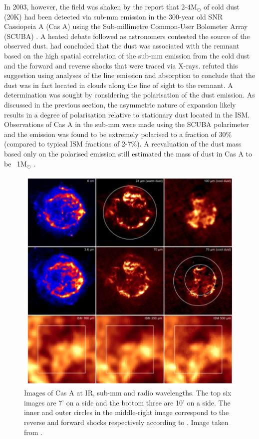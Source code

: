 In 2003, however, the field was shaken by the report that 2-4M$_{\odot}$ of cold dust (20K) had been detected via sub-mm emission in the 300-year old SNR Cassiopeia A (Cas A) using the Sub-millimetre Common-User Bolometer Array (SCUBA) \citep{Dunne2003}.   A heated debate followed as astronomers contested the source of the observed dust.  \citet{Dunne2003} had concluded that the dust was associated with the remnant based on the high spatial correlation of the sub-mm emission from the cold dust and the forward and reverse shocks that were traced via X-rays. \citet{Krause2004} refuted this suggestion using analyses of the line emission and absorption to conclude that the dust was in fact located in clouds along the line of sight to the remnant.  A determination was sought by considering the polarisation of the dust emission.  As discussed in the previous section, the asymmetric nature of expansion likely results in a degree of polarisation relative to stationary dust located in the ISM.  Observations of Cas A in the sub-mm were made using the SCUBA polarimeter and the emission was found to be extremely polarised to a fraction of 30\% (compared to typical ISM fractions of 2-7\%).  A reevaluation of the dust mass based only on the polarised emission still estimated the mass of dust in Cas A to be ~1M$_{\odot}$ \citep{Dunne2009}.

\begin{figure}
\centering
\includegraphics[clip=true,scale=0.425,trim= 0 0 0 0]{chapters/chapter1/figs/CasA.png}
\caption{Images of Cas A at IR, sub-mm and radio wavelengths.  The top six images are 7' on a side and the bottom three are 10' on a side.  The inner and outer circles in the middle-right image correspond to the reverse and forward shocks respectively according to \citep{Gotthelf2001}.  Image taken from \citet{Barlow2010}.}
\label{fig:CasA}
\end{figure}


